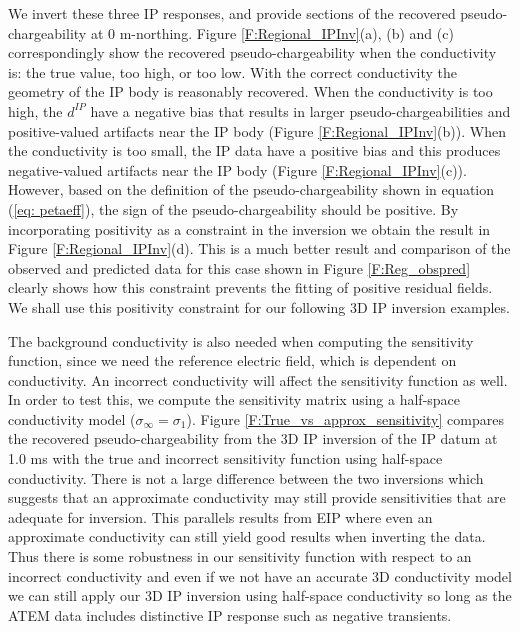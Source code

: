 \documentclass[extra,mreferee]{gji}
\newcommand{\siginf}{\sigma_\infty}
\newcommand{\dip}{d^{IP}}
\begin{document}
We invert these three IP responses, and provide sections of the recovered pseudo-chargeability at 0 m-northing. 
Figure \ref{F:Regional_IPInv}(a), (b) and (c) correspondingly show the recovered pseudo-chargeability when the conductivity is: the true value, too high, or too low.  
With the correct conductivity the geometry of the IP body is reasonably recovered. 
When the conductivity is too high, the $\dip$ have a negative bias that results in larger pseudo-chargeabilities and positive-valued artifacts near the IP body (Figure \ref{F:Regional_IPInv}(b)).  
When the conductivity is too small, the IP data have a positive bias and this produces  negative-valued artifacts near the IP body (Figure \ref{F:Regional_IPInv}(c)). However, based on the  definition of the pseudo-chargeability shown in equation (\ref{eq: petaeff}), the sign of the pseudo-chargeability should be positive. By incorporating positivity as a constraint in the inversion we obtain the result in  Figure \ref{F:Regional_IPInv}(d).  This is a much better result and comparison of the observed and predicted data for this case shown in Figure \ref{F:Reg_obspred} clearly shows how this constraint prevents the fitting of positive residual fields. We shall use this positivity  constraint for our following 3D IP inversion examples. 

The background conductivity is also needed when computing the sensitivity function, since we need the reference electric field, which is dependent on conductivity. 
An incorrect conductivity will affect the sensitivity function as well. 
In order to test this, we compute the sensitivity  matrix using a half-space conductivity model ($\siginf = \sigma_1$). 
Figure \ref{F:True_vs_approx_sensitivity} compares the recovered pseudo-chargeability from the 3D IP inversion of the IP datum at 1.0 ms with the true and incorrect sensitivity function using half-space conductivity. 
There is not a large difference between the two inversions  which suggests that an approximate conductivity may still provide sensitivities that are adequate for inversion. This parallels results from EIP where even an approximate conductivity can still yield good results when inverting the data. Thus there is some robustness in our sensitivity function with respect to an  incorrect conductivity and even if we  not have an accurate 3D conductivity model we can still apply our 3D IP inversion using half-space conductivity so long as the ATEM data includes distinctive IP response such as negative transients.
\end{document}
